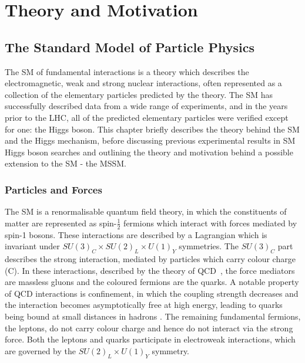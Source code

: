 \chapter{Theory and Motivation}
\label{chap:theory}

\section{The Standard Model of Particle Physics}
\label{sec:theSM}

The \ac{SM} of fundamental interactions is a theory
which describes the electromagnetic, weak and strong nuclear interactions, often
represented as a collection of the elementary particles predicted by the theory.
The \ac{SM} has successfully described data from a wide range of experiments, and in the 
years prior to the LHC, all of the predicted elementary particles were verified 
except for one: the Higgs boson. This chapter briefly describes the theory
behind the \ac{SM} and the Higgs mechanism, before discussing previous
experimental results in \ac{SM} Higgs boson searches and outlining the theory
and motivation behind a possible extension to the \ac{SM} - the \ac{MSSM}.

\subsection{Particles and Forces} 
\label{sec:particlesandforces}

The \ac{SM} is a renormalisable quantum field theory, in which the constituents of
matter are represented as spin-$\frac{1}{2}$ fermions which interact with
forces mediated by spin-1 bosons. These interactions are described by a
Lagrangian which is invariant under $SU(3)_{C} \times SU(2)_{L} \times U(1)_{Y}$
symmetries. The $SU(3)_{C}$ part describes the strong interaction, mediated by
particles which carry colour charge (C). In these interactions, described by the
theory of \ac{QCD}~\cite{Griffiths:2008nx,Perkins:2000uq}, the force mediators are massless gluons
and the coloured fermions are the quarks. A notable property of QCD interactions
is confinement, in which the coupling strength decreases and the interaction
becomes asymptotically free at high energy, leading to quarks being bound at 
small distances in hadrons \cite{Gross:1973id,Politzer:1973fx}. The remaining fundamental fermions,
the leptons, do not carry colour charge and hence do not interact via the strong
force. Both the leptons and quarks participate in electroweak interactions,
which are governed by the $SU(2)_{L} \times U(1)_{Y}$ symmetry.

